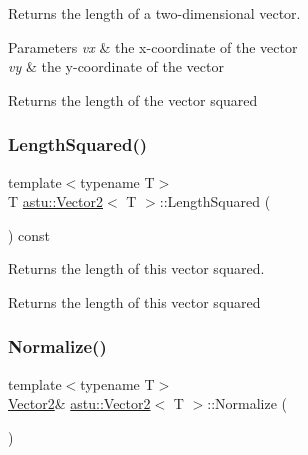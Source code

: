 Returns the length of a two-\/dimensional vector.


\begin{DoxyParams}{Parameters}
{\em vx} & the x-\/coordinate of the vector \\
\hline
{\em vy} & the y-\/coordinate of the vector \\
\hline
\end{DoxyParams}
\begin{DoxyReturn}{Returns}
the length of the vector squared 
\end{DoxyReturn}
\mbox{\label{classastu_1_1Vector2_a42ff8efbc4747ec1042867e30e565311}} 
\subsubsection{\texorpdfstring{Length\+Squared()}{LengthSquared()}\hspace{0.1cm}{\footnotesize\ttfamily [2/2]}}
{\footnotesize\ttfamily template$<$typename T$>$ \\
T \hyperlink{classastu_1_1Vector2}{astu\+::\+Vector2}$<$ T $>$\+::Length\+Squared (\begin{DoxyParamCaption}{ }\end{DoxyParamCaption}) const\hspace{0.3cm}{\ttfamily [inline]}}

Returns the length of this vector squared.

\begin{DoxyReturn}{Returns}
the length of this vector squared 
\end{DoxyReturn}
\mbox{\label{classastu_1_1Vector2_aedecfe4d0a04bb6e3b6dd94caa16e911}} 
\subsubsection{\texorpdfstring{Normalize()}{Normalize()}}
{\footnotesize\ttfamily template$<$typename T$>$ \\
\hyperlink{classastu_1_1Vector2}{Vector2}\& \hyperlink{classastu_1_1Vector2}{astu\+::\+Vector2}$<$ T $>$\+::Normalize (\begin{DoxyParamCaption}{ }\end{DoxyParamCaption})\hspace{0.3cm}{\ttfamily [inline]}}

